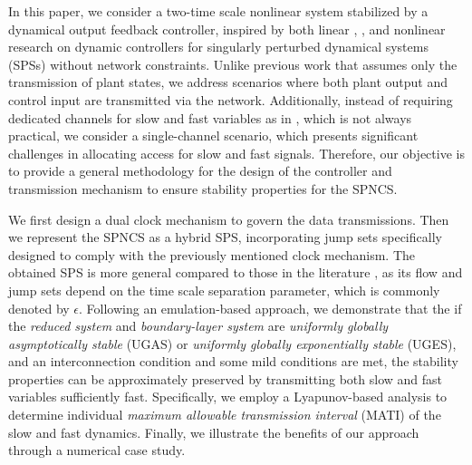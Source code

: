 In this paper, we consider a two-time scale nonlinear system stabilized by a dynamical output feedback controller, inspired by both linear \cite{linear1980}, \cite{linear2018}, \cite{linear2010} and nonlinear \cite{output_feedback} research on dynamic controllers for singularly perturbed dynamical systems (SPSs) \cite{nonlinear_systems_Khalil} without network constraints. Unlike previous work \cite{SPNCS} that assumes only the transmission of plant states, we address scenarios where both plant output and control input are transmitted via the network. 
%
Additionally, instead of requiring dedicated channels for slow and fast variables as in \cite{SPNCS}, which is not always practical, we consider a single-channel scenario, which presents significant challenges in allocating access for slow and fast signals.
Therefore, our objective is to provide a general methodology for the design of the controller and transmission mechanism to ensure stability properties for the SPNCS.





We first design a dual clock mechanism to govern the data transmissions.
Then we represent the SPNCS as a hybrid SPS, incorporating jump sets specifically designed to comply with the previously mentioned clock mechanism.
The obtained SPS is more general compared to those in the literature \cite{sanfelice2011singular,wang2012analysis}%
, as its flow and jump sets depend on the time scale separation parameter, which is commonly denoted by $\epsilon$.
%
Following an emulation-based approach, we demonstrate that the if the \emph{reduced system} and \emph{boundary-layer system} are \emph{uniformly globally asymptotically stable} (UGAS) or \emph{uniformly globally exponentially stable} (UGES), and an interconnection condition and some mild conditions are met, the stability properties can be approximately preserved by transmitting both slow and fast variables sufficiently fast.
%
Specifically, we employ a Lyapunov-based analysis to determine individual \emph{maximum allowable transmission interval} (MATI) \cite{dragan_stability,carnevale_stability} of the slow and fast dynamics.
%
Finally, we illustrate the benefits of our approach through a numerical case study.

